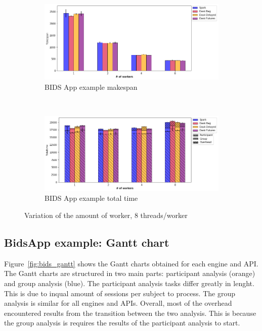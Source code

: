 \documentclass[conference]{IEEEtran}
\begin{document}
\begin{figure}[!t]
    \centering
    \begin{subfigure}[b]{\columnwidth}
        \includegraphics[clip,width=\columnwidth]{images/bids_worker.png}%
        \caption{BIDS App example makespan}\label{fig:bids_ms_worker}
    \end{subfigure}
    \\
    \begin{subfigure}[b]{\columnwidth}
        \includegraphics[clip,width=\columnwidth]{images/bids_idle_worker.png}%
        \caption{BIDS App example total time}\label{fig:bids_tt_worker}
    \end{subfigure}
    \caption{Variation of the amount of worker, 8 threads/worker}
\end{figure}


\subsection{BidsApp example: Gantt chart}
Figure~\ref{fig:bids_gantt} shows the Gantt charts obtained for each engine and API.
The Gantt charts are structured in two main parts: participant analysis (orange) and
group analysis (blue). The participant analysis tasks differ greatly in lenght. This
is due to inqual amount of sessions per subject to process. The group analysis is
similar for all engines and APIs. Overall, most of the overhead encountered results
from the transition between the two analysis. This is because the group analysis is
requires the results of the participant analysis to start.
\end{document}
